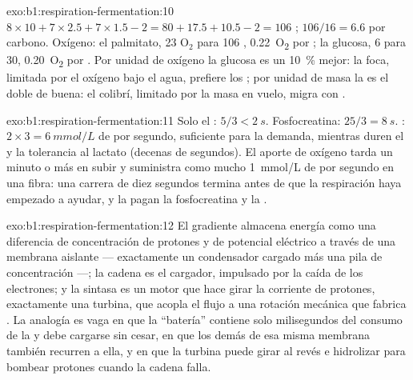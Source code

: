 \begin{solution}{exo:b1:respiration-fermentation:10}
$8\times 10 + 7\times 2.5 + 7\times 1.5 - 2 = 80 + 17.5 + 10.5 - 2 =
106$ ; $106/16 = 6.6$ por carbono. Oxígeno: el palmitato, 23
$\mathrm{O_2}$ para 106 , \qty{0.22}{O_2} por ; la glucosa, 6 para 30,
\qty{0.20}{O_2} por . Por unidad de oxígeno la glucosa es un
\qty{10}{\%} mejor: la foca, limitada por el oxígeno bajo el agua, prefiere
los ; por unidad de masa la  es el doble de buena: el colibrí,
limitado por la masa en vuelo, migra con .
\end{solution}

\begin{solution}{exo:b1:respiration-fermentation:11}
Solo el : $5/3 < \qty{2}{s}$. Fosfocreatina: $25/3 = \qty{8}{s}$.
: $2\times 3 = \qty{6}{mmol/L}$ de  por segundo, suficiente
para la demanda, mientras duren el  y la tolerancia al lactato
(decenas de segundos). El aporte de oxígeno tarda un minuto o más en subir y
suministra como mucho \qty{1}{mmol/L} de  por segundo en una fibra: una
carrera de diez segundos termina antes de que la respiración haya empezado a
ayudar, y la pagan la fosfocreatina y la .
\end{solution}

\begin{solution}{exo:b1:respiration-fermentation:12}
El gradiente almacena energía como una diferencia de concentración de
protones y de potencial eléctrico a través de una membrana aislante ---
exactamente un condensador cargado más una pila de concentración ---; la
cadena es el cargador, impulsado por la caída de los electrones; y la
sintasa es un motor que hace girar la corriente de protones, exactamente una
turbina, que acopla el flujo a una rotación mecánica que fabrica . La
analogía es vaga en que la ``batería'' contiene solo milisegundos del
consumo de la  y debe cargarse sin cesar, en que los demás
 de esa misma membrana también recurren a ella, y en que la
turbina puede girar al revés e hidrolizar  para bombear protones cuando
la cadena falla.
\end{solution}

